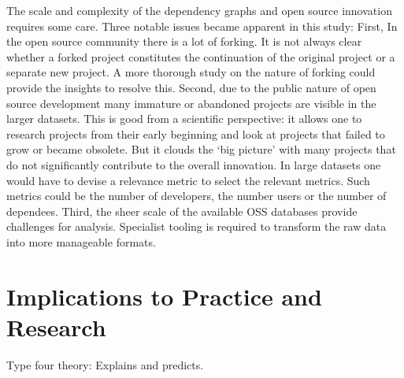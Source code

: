 \documentclass[smallextended,final]{svjour3}
\begin{document}
The scale and complexity of the dependency graphs and open source innovation requires some care. Three notable issues became apparent in this study: First, In the open source community there is a lot of forking. It is not always clear whether a forked project constitutes the continuation of the original project or a separate new project. A more thorough study on the nature of forking could provide the insights to resolve this. Second, due to the public nature of open source development many immature or abandoned projects are visible in the larger datasets. This is good from a scientific perspective: it allows one to research projects from their early beginning and look at projects that failed to grow or became obsolete. But it clouds the `big picture' with many projects that do not significantly contribute to the overall innovation. In large datasets one would have to devise a relevance metric to select the relevant metrics. Such metrics could be the number of developers, the number users or the number of dependees. Third, the sheer scale of the available OSS databases provide challenges for analysis. Specialist tooling is required to transform the raw data into more manageable formats.

\section{Implications to Practice and Research}

Type four theory: Explains and predicts.



\end{document}
